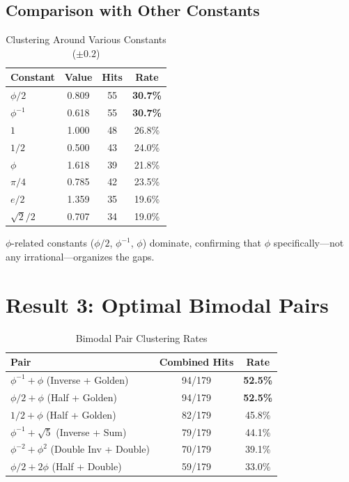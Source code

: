 \documentclass[11pt,a4paper]{article}
\begin{document}
\subsection{Comparison with Other Constants}

\begin{table}[H]
\centering
\caption{Clustering Around Various Constants ($\pm 0.2$)}
\label{tab:constants}
\begin{tabular}{@{}lccc@{}}
\toprule
\textbf{Constant} & \textbf{Value} & \textbf{Hits} & \textbf{Rate} \\
\midrule
$\phi/2$ & 0.809 & 55 & \textbf{30.7\%} \\
$\phi^{-1}$ & 0.618 & 55 & \textbf{30.7\%} \\
$1$ & 1.000 & 48 & 26.8\% \\
$1/2$ & 0.500 & 43 & 24.0\% \\
$\phi$ & 1.618 & 39 & 21.8\% \\
$\pi/4$ & 0.785 & 42 & 23.5\% \\
$e/2$ & 1.359 & 35 & 19.6\% \\
$\sqrt{2}/2$ & 0.707 & 34 & 19.0\% \\
\bottomrule
\end{tabular}
\end{table}

$\phi$-related constants ($\phi/2$, $\phi^{-1}$, $\phi$) dominate, confirming that $\phi$ specifically—not any irrational—organizes the gaps.

\newpage

\section{Result 3: Optimal Bimodal Pairs}
\label{sec:pairs}

\begin{table}[H]
\centering
\caption{Bimodal Pair Clustering Rates}
\label{tab:bimodal}
\begin{tabular}{@{}lcc@{}}
\toprule
\textbf{Pair} & \textbf{Combined Hits} & \textbf{Rate} \\
\midrule
$\phi^{-1} + \phi$ (Inverse + Golden) & 94/179 & \textbf{52.5\%} \\
$\phi/2 + \phi$ (Half + Golden) & 94/179 & \textbf{52.5\%} \\
$1/2 + \phi$ (Half + Golden) & 82/179 & 45.8\% \\
$\phi^{-1} + \sqrt{5}$ (Inverse + Sum) & 79/179 & 44.1\% \\
$\phi^{-2} + \phi^2$ (Double Inv + Double) & 70/179 & 39.1\% \\
$\phi/2 + 2\phi$ (Half + Double) & 59/179 & 33.0\% \\
\bottomrule
\end{tabular}
\end{table}
\end{document}
